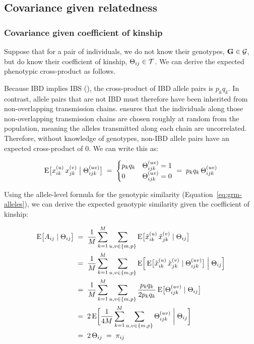 \documentclass[12pt]{article}
\numberwithin{equation}{section}
\begin{document}
\subsection{Covariance given relatedness}\label{sec:rm-relatedness}

\subsubsection{Covariance given coefficient of kinship}\label{sec:rm-kinship}
Suppose that for a pair of individuals, we do not know their genotypes, $\mathbf{G} \in \mathcal{G}$, but do know their coefficient of kinship, $\Theta_{ij} \in \mathcal{T}$.
We can derive the expected phenotypic cross-product as follows.

Because IBD implies IBS (), the cross-product of IBD allele pairs is $p_k q_k$.
In contrast, allele pairs that are not IBD must therefore have been inherited from non-overlapping transmission chains.
 ensures that the individuals along those non-overlapping transmission chains are chosen roughly at random from the population, meaning the alleles transmitted along each chain are uncorrelated.
Therefore, without knowledge of genotypes, non-IBD allele pairs have an expected cross-product of $0$. 
We can write this as:

\begin{equation}\label{eq:allele-cross-ibd}
    \mathrm{E}\big[x^{(u)}_{ik}\, x^{(v)}_{jk} \;\big|\; \Theta^{(uv)}_{ijk}\big]
    \;=\; \begin{cases}
        p_k q_k & \Theta^{(uv)}_{ijk} = 1 \\
        0 & \Theta^{(uv)}_{ijk} = 0
    \end{cases}
    \;=\; p_k q_k\, \Theta^{(uv)}_{ijk}
\end{equation}

Using the allele-level formula for the genotypic similarity (Equation~\eqref{eq:grm-alleles}), we can derive the expected genotypic similarity given the coefficient of kinship:

\begin{equation}\label{eq:grm-kinship}
\begin{aligned}
    \mathrm{E}\big[A_{ij} \mid \Theta_{ij}\big]
    \;&=\; \frac{1}{M} \sum_{k=1}^{M} \sum_{u,v \in \{m,p\}} \mathrm{E}\big[\tilde{x}^{(u)}_{ik}\, \tilde{x}^{(v)}_{jk} \mid \Theta_{ij}\big] \\
    \;&=\; \frac{1}{M} \sum_{k=1}^{M} \sum_{u,v \in \{m,p\}} \mathrm{E}\Big[\, \mathrm{E}\big[\tilde{x}^{(u)}_{ik}\, \tilde{x}^{(v)}_{jk} \mid \Theta^{(uv)}_{ijk}\big] \;\Big|\; \Theta_{ij}\Big] \\
    \;&=\; \frac{1}{M} \sum_{k=1}^{M} \sum_{u,v \in \{m,p\}} \frac{p_k q_k}{2p_k q_k}\, \mathrm{E}\big[\Theta^{(uv)}_{ijk} \mid \Theta_{ij}\big] \\
    \;&=\; 2\, \mathrm{E}\bigg[\frac{1}{4M} \sum_{k=1}^{M} \sum_{u,v \in \{m,p\}} \Theta^{(uv)}_{ijk} \;\bigg|\; \Theta_{ij}\bigg] \\
    \;&=\; 2\, \Theta_{ij} \;=\; \pi_{ij}
\end{aligned}
\end{equation}
\end{document}
